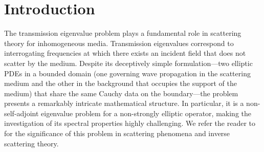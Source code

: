 \documentclass[10pt,a4paper]{amsart}
\begin{document}
\section{Introduction}
The transmission eigenvalue problem plays a fundamental role in scattering theory for inhomogeneous media. Transmission eigenvalues correspond to interrogating frequencies at which there exists an incident field that does not scatter by the medium. Despite its deceptively simple formulation—two elliptic PDEs in a bounded domain (one governing wave propagation in the scattering medium and the other in the background that occupies the support of the medium) that share the same Cauchy data on the boundary—the problem presents a remarkably intricate mathematical structure. In particular, it is a non-self-adjoint eigenvalue problem for a non-strongly elliptic operator, making the investigation of its spectral properties highly challenging. We refer the reader to \cite{CCH-book} for the significance of this problem in scattering phenomena and inverse scattering theory.
\end{document}
